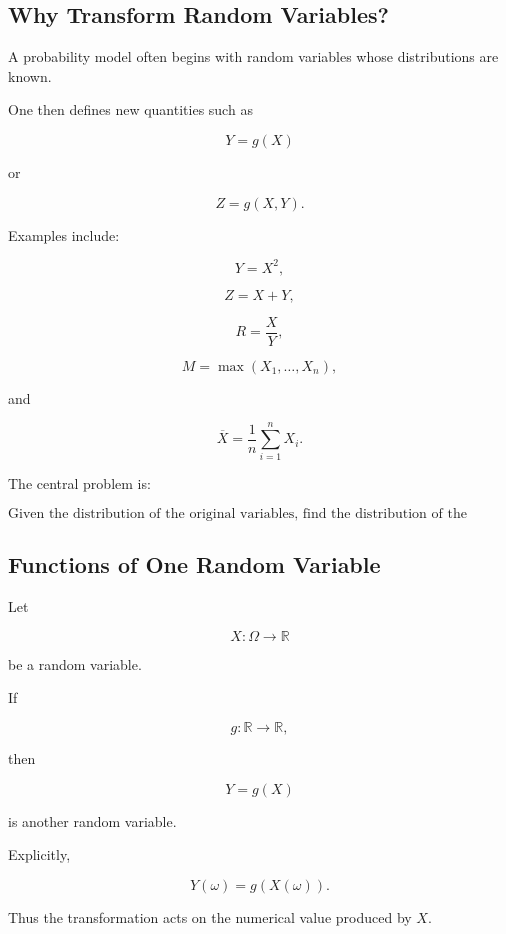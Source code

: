 \subsection{Why Transform Random Variables?}
\label{subsec:why-transform-random-variables}

A probability model often begins with random variables whose
distributions are known.

One then defines new quantities such as

\[
Y=g(X)
\]

or

\[
Z=g(X,Y).
\]

Examples include:

\[
Y=X^2,
\]

\[
Z=X+Y,
\]

\[
R=\frac{X}{Y},
\]

\[
M=\max(X_1,\ldots,X_n),
\]

and

\[
\overline{X}
=
\frac1n
\sum_{i=1}^{n}X_i.
\]

The central problem is:

\[
\boxed{
\text{Given the distribution of the original variables, find the
distribution of the transformed variable.}
}
\]

\subsection{Functions of One Random Variable}
\label{subsec:function-one-rv}

Let

\[
X:\Omega\to\mathbb{R}
\]

be a random variable.

If

\[
g:\mathbb{R}\to\mathbb{R},
\]

then

\[
\boxed{
Y=g(X)
}
\]

is another random variable.

Explicitly,

\[
Y(\omega)
=
g(X(\omega)).
\]

Thus the transformation acts on the numerical value produced by \(X\).

